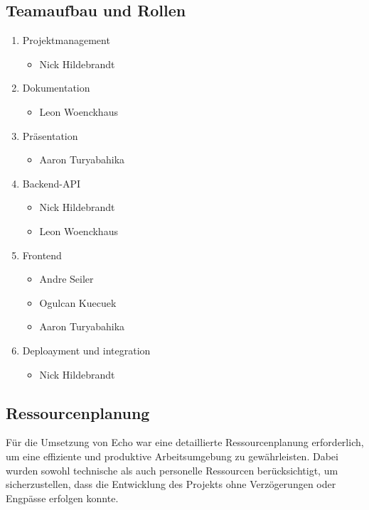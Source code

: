 \documentclass[a4paper,12pt]{article}
\begin{document}
\subsection{Teamaufbau und Rollen}
\begin{enumerate}
    \item Projektmanagement
    \begin{itemize}
        \item Nick Hildebrandt
    \end{itemize}
    \item Dokumentation
    \begin{itemize}
    	\item Leon Woenckhaus
    \end{itemize}
    \item Präsentation
    \begin{itemize}
    	\item Aaron Turyabahika
    \end{itemize}
    \item Backend-API
    \begin{itemize}
        \item Nick Hildebrandt
        \item Leon Woenckhaus
    \end{itemize}
    \item Frontend
    \begin{itemize}
        \item Andre Seiler
        \item Ogulcan Kuecuek
    	\item Aaron Turyabahika
    \end{itemize}
    \item Deploayment und integration
    \begin{itemize}
        \item Nick Hildebrandt
    \end{itemize}
\end{enumerate}

\subsection{Ressourcenplanung}
Für die Umsetzung von Echo war eine detaillierte
Ressourcenplanung erforderlich, um eine effiziente und produktive
Arbeitsumgebung zu gewährleisten. Dabei wurden sowohl technische als auch
personelle Ressourcen berücksichtigt, um sicherzustellen, dass die Entwicklung
des Projekts ohne Verzögerungen oder Engpässe erfolgen konnte.
\end{document}
